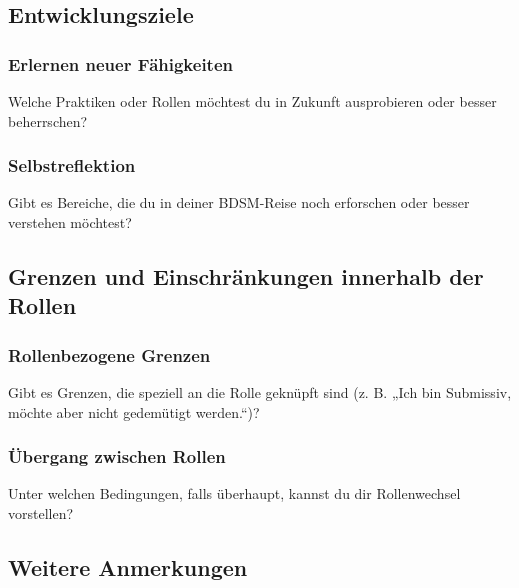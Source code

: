 \documentclass[a4paper,12pt]{article}
\begin{document}
\subsection{Entwicklungsziele}
\subsubsection{Erlernen neuer Fähigkeiten}
\noindent Welche Praktiken oder Rollen möchtest du in Zukunft ausprobieren oder besser beherrschen? \newline
\noindent \TextField[name=ZieleNeues,multiline=true,height=7em, width=37em]{}

\subsubsection{Selbstreflektion}
\noindent Gibt es Bereiche, die du in deiner BDSM-Reise noch erforschen oder besser verstehen möchtest? \newline
\noindent \TextField[name=ZieleReflektion,multiline=true,height=7em, width=37em]{}

\subsection{Grenzen und Einschränkungen innerhalb der Rollen}
\subsubsection{Rollenbezogene Grenzen}
\noindent Gibt es Grenzen, die speziell an die Rolle geknüpft sind (z. B. „Ich bin Submissiv, möchte aber nicht gedemütigt werden.“)?\newline
\noindent \TextField[name=GrenzRolleInnerhalb,multiline=true,height=7em, width=37em]{}

\subsubsection{Übergang zwischen Rollen}
\noindent Unter welchen Bedingungen, falls überhaupt, kannst du dir Rollenwechsel vorstellen? \newline
\noindent \TextField[name=RolleUebergang,multiline=true,height=7em, width=37em]{}

\subsection{Weitere Anmerkungen}
\noindent \TextField[name=AftercareBesonders,multiline=true,height=17em, width=37em]{}
\end{document}
